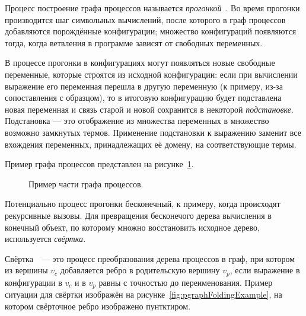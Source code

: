 Процесс построение графа процессов называется \emph{прогонкой}~.
Во время прогонки производится шаг символьных вычислений, после которого
в граф процессов добавляются порождённые конфигурации; множество конфигураций
появляются тогда, когда ветвления в программе зависят от свободных переменных.

В процессе прогонки в конфигурациях могут появляться новые свободные переменные,
которые строятся из исходной конфигурации:
если при вычислении выражение его переменная перешла в другую переменную (к примеру, из-за сопоставления с образцом),
то в итоговую конфигурацию будет подставлена новая переменная и связь старой и новой сохранится в
некоторой \emph{подстановке}.
Подстановка --- это отображение из множества переменных в множество возможно замкнутых термов.
Применение подстановки к выражению заменит все вхождения переменных, принадлежащих её домену,
на соответствующие термы. 

Пример графа процессов представлен на рисунке~\ref{fig:pgraphExample}.

\begin{figure}[h!]
\center
{}

\label{fig:pgraphExample}
\caption{Пример части графа процессов.}
\end{figure}

Потенциально процесс прогонки бесконечный, к примеру, когда происходят рекурсивные вызовы.
Для превращения бесконечого дерева вычисления в конечный объект, по которому множно
восстановить исходное дерево, используется \emph{свёртка.}

Свёртка~~--- это процесс преобразования дерева процессов в граф, при котором
из вершины $v_c$ добавляется ребро в родительскую вершину $v_p$,
если выражение в конфигурации в $v_c$ и в $v_p$ равны с точностью до переименования.
Пример ситуации для свёртки изображён на рисунке~\ref{fig:pgraphFoldingExample},
на котором свёрточное ребро изображено пунтктиром.

